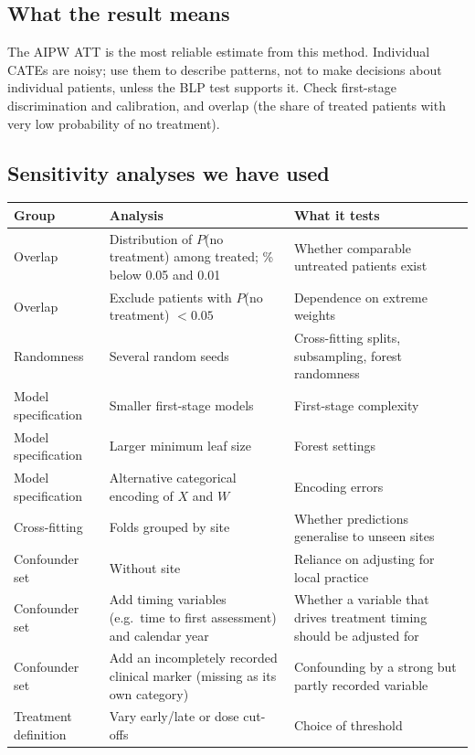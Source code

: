 \subsection{What the result means}

The AIPW ATT is the most reliable estimate from this method. Individual CATEs are noisy; use them to describe patterns, not to make decisions about individual patients, unless the BLP test supports it. Check first-stage discrimination and calibration, and overlap (the share of treated patients with very low probability of no treatment).

\subsection{Sensitivity analyses we have used}

\begin{xltabular}{\textwidth}{L{2.6cm}YY}
\toprule
\textbf{Group} & \textbf{Analysis} & \textbf{What it tests} \\
\midrule
\endhead
Overlap & Distribution of $P$(no treatment) among treated; \% below 0.05 and 0.01 \cite{crump2009} & Whether comparable untreated patients exist \\
Overlap & Exclude patients with $P$(no treatment) $< 0.05$ & Dependence on extreme weights \\
Randomness & Several random seeds & Cross-fitting splits, subsampling, forest randomness \\
Model specification & Smaller first-stage models & First-stage complexity \\
Model specification & Larger minimum leaf size & Forest settings \\
Model specification & Alternative categorical encoding of $X$ and $W$ & Encoding errors \\
Cross-fitting & Folds grouped by site & Whether predictions generalise to unseen sites \\
Confounder set & Without site & Reliance on adjusting for local practice \\
Confounder set & Add timing variables (e.g.\ time to first assessment) and calendar year & Whether a variable that drives treatment timing should be adjusted for \\
Confounder set & Add an incompletely recorded clinical marker (missing as its own category) & Confounding by a strong but partly recorded variable \\
Treatment definition & Vary early/late or dose cut-offs & Choice of threshold \\

\end{xltabular}
